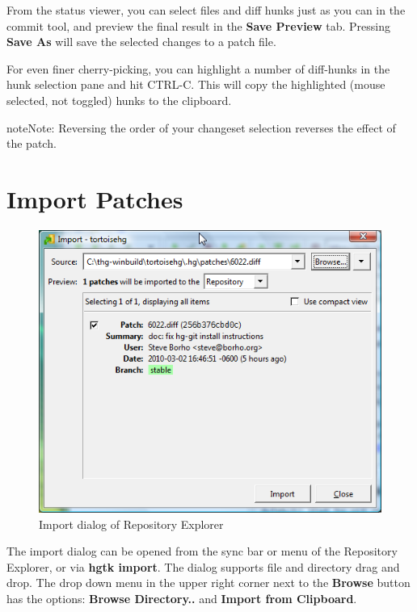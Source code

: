 \documentclass[letterpaper,10pt,english]{manual}
\begin{document}
From the status viewer, you can select files and diff hunks just as you
can in the commit tool, and preview the final result in the
\textbf{Save Preview} tab.  Pressing \textbf{Save As} will save
the selected changes to a patch file.

For even finer cherry-picking, you can highlight a number of diff-hunks
in the hunk selection pane and hit CTRL-C.  This will copy the
highlighted (mouse selected, not toggled) hunks to the clipboard.

\begin{notice}{note}{Note:}
Reversing the order of your changeset selection reverses the effect
of the patch.
\end{notice}


\section{Import Patches}
\begin{figure}[htbp]
\centering

\includegraphics{import.png}
\caption{Import dialog of Repository Explorer}\end{figure}

The import dialog can be opened from the sync bar or menu of the
Repository Explorer, or via \textbf{hgtk import}.  The dialog supports
file and directory drag and drop.  The drop down menu in the upper right
corner next to the \textbf{Browse} button has the options:
\textbf{Browse Directory..} and \textbf{Import from Clipboard}.
\end{document}

